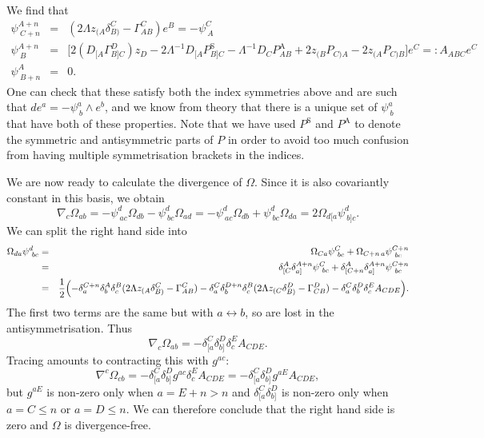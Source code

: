 We find that 
\begin{eqnarray*}
\psi_{\ C+n}^{A+n} & = & (2\Lambda z_{(A}\delta_{B)}^{C}-\Gamma_{AB}^{C})e^{B}=-\psi_{\ A}^{C}\\
\psi_{\ B}^{A+n} & = & \bigl[2(D_{[A}\Gamma_{B]C}^{D})z_{D}-2\Lambda^{-1}D_{[A}P_{B]C}^{\mathrm{S}}-\Lambda^{-1}D_{C}P_{AB}^{\mathrm{A}}+2z_{(B}P_{C)A}-2z_{(A}P_{C)B}\bigr]e^{C}=:A_{ABC}e^{C}\\
\psi_{\ B+n}^{A} & = & 0.
\end{eqnarray*}
One can check that these satisfy both the index symmetries above and
are such that ${d}e^{a}=-\psi_{\ b}^{a}\wedge e^{b}$, and
we know from theory that there is a unique set of $\psi_{\ b}^{a}$
that have both of these properties. Note that we have used $P^{\mathrm{S}}$
and $P^{\mathrm{A}}$ to denote the symmetric and antisymmetric parts
of $P$ in order to avoid too much confusion from having multiple
symmetrisation brackets in the indices.

We are now ready to calculate the divergence of $\Omega$. Since it
is also covariantly constant in this basis, we obtain
\[
\nabla_{c}\Omega_{ab}=-\psi_{\ ac}^{d}\Omega_{db}-\psi_{\ bc}^{d}\Omega_{ad}=-\psi_{\ ac}^{d}\Omega_{db}+\psi_{\ bc}^{d}\Omega_{da}=2\Omega_{d[a}\psi_{\ b]c}^{d}.
\]
We can split the right hand side into
\begin{eqnarray*}
\Omega_{da}\psi_{\ bc}^{d} & = & \Omega_{Ca}\psi_{\ bc}^{C}+\Omega_{C+n\, a}\psi_{\ bc}^{C+n}\\
 & = & \delta_{[C}^{A}\delta_{a]}^{A+n}\psi_{\ bc}^{C}+\delta_{[C+n}^{A}\delta_{a]}^{A+n}\psi_{\ bc}^{C+n}\\
 & = & \frac{1}{2}\Bigl(-\delta_{a}^{C+n}\delta_{b}^{A}\delta_{c}^{B}(2\Lambda z_{(A}\delta_{B)}^{C}-\Gamma_{AB}^{C})-\delta_{a}^{C}\delta_{b}^{D+n}\delta_{c}^{B}(2\Lambda z_{(C}\delta_{B)}^{D}-\Gamma_{CB}^{D})-\delta_{a}^{C}\delta_{b}^{D}\delta_{c}^{E}A_{CDE}\Bigr).\\
\end{eqnarray*}
The first two terms are the same but with $a\leftrightarrow b$, so
are lost in the antisymmetrisation. Thus
\[
\nabla_{c}\Omega_{ab}=-\delta_{[a}^{C}\delta_{b]}^{D}\delta_{c}^{E}A_{CDE}.
\]
Tracing amounts to contracting this with $g^{ac}$:
\[
\nabla^{c}\Omega_{cb}=-\delta_{[a}^{C}\delta_{b]}^{D}g^{ac}\delta_{c}^{E}A_{CDE}=-\delta_{[a}^{C}\delta_{b]}^{D}g^{aE}A_{CDE},
\]
but $g^{aE}$ is non-zero only when $a=E+n>n$ and $\delta_{[a}^{C}\delta_{b]}^{D}$
is non-zero only when $a=C\leq n$ or $a=D\leq n$. We can therefore
conclude that the right hand side is zero and $\Omega$ is divergence-free.


